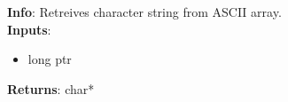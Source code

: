 \textbf{Info}: Retreives character string from ASCII array. \\

\noindent \textbf{Inputs}:
\begin{itemize}
\item{long ptr}
\end{itemize}

\noindent \textbf{Returns}: char*
